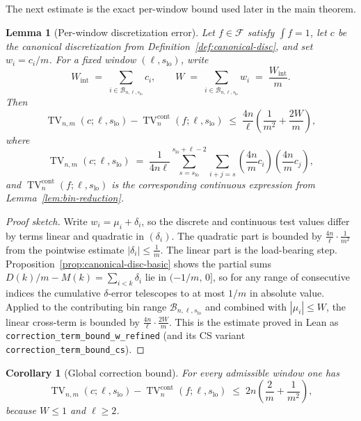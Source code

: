 \documentclass[11pt, letterpaper]{article}
\theoremstyle{paperplain}
\newtheorem{lemma}[theorem]{Lemma}
\newtheorem{corollary}[theorem]{Corollary}
\theoremstyle{paperdef}
\begin{document}
The next estimate is the exact per-window bound used later in the main
theorem.

\begin{lemma}[Per-window discretization error]
\label{lem:disc-error}
Let $f\in\mathcal{F}$ satisfy $\int f=1$, let
$c$ be the canonical discretization from
Definition~\ref{def:canonical-disc}, and set
$w_i=c_i/m$.  For a fixed window $(\ell,s_{\mathrm{lo}})$, write
\[
  W_{\mathrm{int}}
  \;=\;
  \sum_{i\in \mathcal{B}_{n,\ell,s_{\mathrm{lo}}}} c_i,
  \qquad
  W
  \;=\;
  \sum_{i\in \mathcal{B}_{n,\ell,s_{\mathrm{lo}}}} w_i
  \;=\;
  \frac{W_{\mathrm{int}}}{m}.
\]
Then
\[
  \operatorname{TV}_{n,m}(c;\ell,s_{\mathrm{lo}})
  -
  \operatorname{TV}^{\mathrm{cont}}_n(f;\ell,s_{\mathrm{lo}})
  \;\le\;
  \frac{4n}{\ell}
  \left(
    \frac{1}{m^2} + \frac{2W}{m}
  \right),
\]
where
\[
  \operatorname{TV}_{n,m}(c;\ell,s_{\mathrm{lo}})
  \;=\;
  \frac{1}{4n\ell}
  \sum_{s=s_{\mathrm{lo}}}^{s_{\mathrm{lo}}+\ell-2}
  \sum_{i+j=s}
  \left(\frac{4n}{m}c_i\right)\left(\frac{4n}{m}c_j\right),
\]
and $\operatorname{TV}^{\mathrm{cont}}_n(f;\ell,s_{\mathrm{lo}})$ is
the corresponding continuous expression from
Lemma~\ref{lem:bin-reduction}.
\end{lemma}

\begin{proof}[Proof sketch]
Write $w_i=\mu_i+\delta_i$, so the discrete and continuous test values
differ by terms linear and quadratic in $(\delta_i)$.  The quadratic
part is bounded by $\tfrac{4n}{\ell}\cdot\tfrac{1}{m^2}$ from the
pointwise estimate $|\delta_i|\le \tfrac{1}{m}$.  The linear part is
the load-bearing step.  Proposition~\ref{prop:canonical-disc-basic}
shows the partial sums
$D(k)/m - M(k) = \sum_{i<k}\delta_i$ lie in $(-1/m,\,0]$, so for any
range of consecutive indices the cumulative $\delta$-error telescopes
to at most $1/m$ in absolute value.  Applied to the contributing bin
range $\mathcal{B}_{n,\ell,s_{\mathrm{lo}}}$ and combined with
$|\mu_i|\le W$, the linear cross-term is bounded by
$\tfrac{4n}{\ell}\cdot \tfrac{2W}{m}$.  This is the estimate proved
in Lean as \texttt{correction\_term\_bound\_w\_refined} (and its CS
variant \texttt{correction\_term\_bound\_cs}).
\end{proof}

\begin{corollary}[Global correction bound]
For every admissible window one has
\[
  \operatorname{TV}_{n,m}(c;\ell,s_{\mathrm{lo}})
  -
  \operatorname{TV}^{\mathrm{cont}}_n(f;\ell,s_{\mathrm{lo}})
  \;\le\;
  2n\left(\frac{2}{m}+\frac{1}{m^2}\right),
\]
because $W\le 1$ and $\ell\ge 2$.
\end{corollary}
\end{document}
